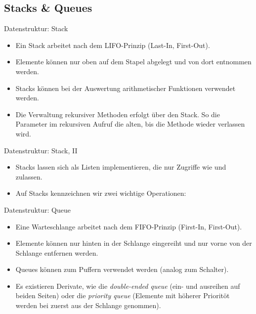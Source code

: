 \subsection{Stacks \& Queues}

\begin{frame}{Datenstruktur: Stack}
    \hypertarget<1>{mrk:Stack}{}%
    \begin{itemize}[<+(1)->]
        \widei
        \item Ein Stack arbeitet nach dem LIFO-Prinzip (Last-In, First-Out).
        \item Elemente können nur oben auf dem Stapel abgelegt und von dort entnommen werden.
        \item Stacks können bei der Auswertung arithmetischer Funktionen verwendet werden.
        \item Die Verwaltung rekursiver Methoden erfolgt über den Stack. So  die Parameter im rekursiven Aufruf die alten, bis die Methode wieder verlassen wird.
    \end{itemize}
\end{frame}

\begin{frame}{Datenstruktur: Stack, II}
    \begin{itemize}[<+(1)->]
        \widei
        \item Stacks lassen sich als Listen implementieren,\pause{} die nur Zugriffe wie  und  zulassen.
        \item Auf Stacks kennzeichnen wir zwei wichtige Operationen: 
    \end{itemize}
\end{frame}

\begin{frame}{Datenstruktur: Queue}
    \begin{itemize}[<+(1)->]
        \widei
        \item Eine Warteschlange arbeitet nach dem FIFO-Prinzip (First-In, First-Out).
        \item Elemente können nur hinten in der Schlange eingereiht und nur vorne von der Schlange entfernen werden.
        \item Queues können zum Puffern verwendet werden (analog zum Schalter).
        \item Es existieren Derivate, wie die \emph{double-ended queue} (ein- und ausreihen auf beiden Seiten) oder die \emph{priority queue} (Elemente mit höherer Prioritöt werden bei  zuerst aus der Schlange genommen).
    \end{itemize}
\end{frame}

